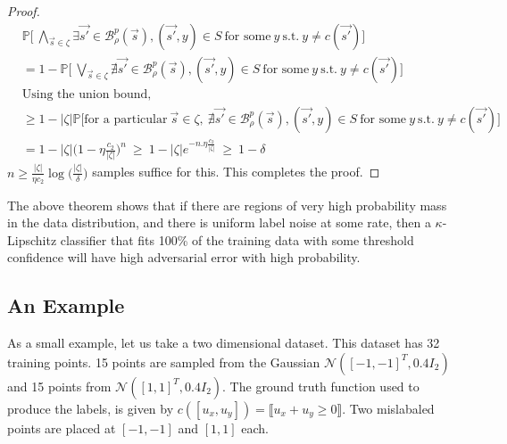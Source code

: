 \documentclass{ociamthesis}
\begin{document}
\begin{proof}
\begin{equation*}
    \label{eq:Lipschitz-extension}
\begin{split}
    & \mathbb{P} \biggl [~\underset{\vec{s} \in \zeta}{\bigwedge} \exists 
    \vec{s'} \in \mathcal{B}_\rho^p(\vec{s}), 
    (\vec{s'}, y) \in S~\text{for some}~ y~\text{s.t.}~y \neq c(\vec{s'})
    \biggr] \\
    & = 1 - \mathbb{P} \biggl [~\underset{\vec{s} \in \zeta}{\bigvee} \nexists 
    \vec{s'} \in \mathcal{B}_\rho^p(\vec{s}), 
    (\vec{s'}, y) \in S~\text{for some}~ y~\text{s.t.}~y \neq c(\vec{s'})
    \biggr] \\
    & \text{Using the union bound,} \\
    & \geq 1 - |\zeta| \mathbb{P} \biggl [\text{for a particular}~\vec{s} \in \zeta,
    ~\nexists \vec{s'} \in \mathcal{B}_\rho^p(\vec{s}), 
    (\vec{s'}, y) \in S~\text{for some}~ y~\text{s.t.}~y \neq c(\vec{s'})
    \biggr] \\
    & = 1 - |\zeta| \biggl(1 - \eta \frac{c_2}{|\zeta|}\biggr)^{n}~
    \geq ~ 1 - |\zeta| e^{-n.\eta \frac{c_2}{|\zeta|}} ~ \geq ~ 1 - \delta
\end{split}
\end{equation*}
$n \geq \frac{|\zeta|}{\eta c_2} \log \bigl(\frac{|\zeta|}{\delta} \bigr)$
samples suffice for this. This completes the proof.
\end{proof}

The above theorem shows that if there are regions of very high probability mass
in the data distribution, and there is uniform label noise at some rate, then a
$\kappa$-Lipschitz classifier that fits 100\% of the training data with some
threshold confidence will have high adversarial error with high probability.

\subsection*{An Example}
As a small example, let us take a two dimensional dataset. This dataset has 32
training points. 15 points are sampled from the Gaussian $\mathcal{N}([-1,
-1]^T, 0.4I_2)$ and 15 points from $\mathcal{N}([1, 1]^T, 0.4I_2)$. The ground
truth function used to produce the labels, is given by $c([u_x, u_y]) =
\llbracket u_x+u_y \geq 0 \rrbracket$. Two mislabaled points are placed at $[-1,
-1]$ and $[1, 1]$ each.
\end{document}
